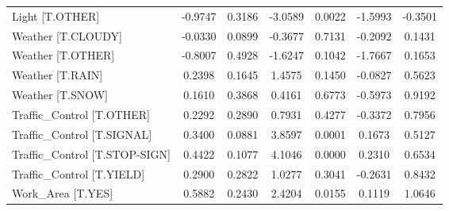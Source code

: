 \begin{longtable}{p{4cm}cccccc}
Light [T.OTHER]                               & -0.9747 &    0.3186 & -3.0589 &       0.0022 & -1.5993 & -0.3501 \\
Weather [T.CLOUDY]                            & -0.0330 &    0.0899 & -0.3677 &       0.7131 & -0.2092 &  0.1431 \\
Weather [T.OTHER]                             & -0.8007 &    0.4928 & -1.6247 &       0.1042 & -1.7667 &  0.1653 \\
Weather [T.RAIN]                              &  0.2398 &    0.1645 &  1.4575 &       0.1450 & -0.0827 &  0.5623 \\
Weather [T.SNOW]                              &  0.1610 &    0.3868 &  0.4161 &       0.6773 & -0.5973 &  0.9192 \\
Traffic\_Control [T.OTHER]                     &  0.2292 &    0.2890 &  0.7931 &       0.4277 & -0.3372 &  0.7956 \\
Traffic\_Control [T.SIGNAL]                    &  0.3400 &    0.0881 &  3.8597 &       0.0001 &  0.1673 &  0.5127 \\
Traffic\_Control [T.STOP-SIGN]                 &  0.4422 &    0.1077 &  4.1046 &       0.0000 &  0.2310 &  0.6534 \\
Traffic\_Control [T.YIELD]                     &  0.2900 &    0.2822 &  1.0277 &       0.3041 & -0.2631 &  0.8432 \\
Work\_Area [T.YES]                             &  0.5882 &    0.2430 &  2.4204 &       0.0155 &  0.1119 &  1.0646 \\
\end{longtable}
